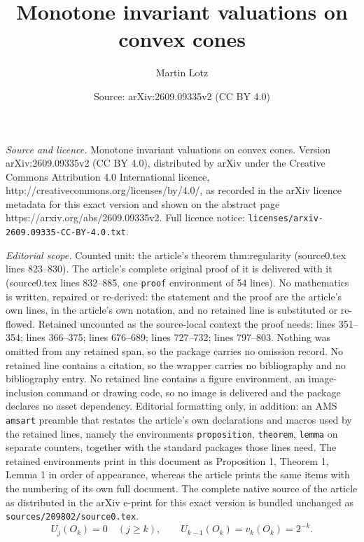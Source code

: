 \documentclass[10pt,a4paper]{amsart}
\title{Monotone invariant valuations on convex cones}
\author{Martin Lotz}
\date{Source: arXiv:2609.09335v2 (CC BY 4.0)}
\begin{document}
\maketitle

\noindent\emph{Source and licence.} Monotone invariant valuations on convex cones. Version arXiv:2609.09335v2 (CC BY 4.0), distributed by arXiv under the Creative Commons Attribution 4.0 International licence, http://creativecommons.org/licenses/by/4.0/, as recorded in the arXiv licence metadata for this exact version and shown on the abstract page https://arxiv.org/abs/2609.09335v2. Full licence notice: \texttt{licenses/arxiv-2609.09335-CC-BY-4.0.txt}.\par\smallskip

\noindent\textit{Editorial scope.} Counted unit: the article's theorem thm:regularity (source0.tex lines 823--830). The article's complete original proof of it is delivered with it (source0.tex lines 832--885, one \texttt{proof} environment of 54 lines). No mathematics is written, repaired or re-derived: the statement and the proof are the article's own lines, in the article's own notation, and no retained line is substituted or re-flowed.  Retained uncounted as the source-local context the proof needs: lines 351--354; lines 366--375; lines 676--689; lines 727--732; lines 797--803.  Nothing was omitted from any retained span, so the package carries no omission record.  No retained line contains a citation, so the wrapper carries no bibliography and no bibliography entry.  No retained line contains a figure environment, an image-inclusion command or drawing code, so no image is delivered and the package declares no asset dependency.  Editorial formatting only, in addition: an AMS \texttt{amsart} preamble that restates the article's own declarations and macros used by the retained lines, namely the environments \texttt{proposition}, \texttt{theorem}, \texttt{lemma} on separate counters, together with the standard packages those lines need.  The retained environments print in this document as Proposition 1, Theorem 1, Lemma 1 in order of appearance, whereas the article prints the same items with the numbering of its own full document.  The complete native source of the article as distributed in the arXiv e-print for this exact version is bundled unchanged as \texttt{sources/209802/source0.tex}.
\begin{equation}\label{eq:orthant-triangular}
  U_j(O_k)=0\quad(j\ge k),\qquad
  U_{k-1}(O_k)=v_k(O_k)=2^{-k}.
\end{equation}
\end{document}
